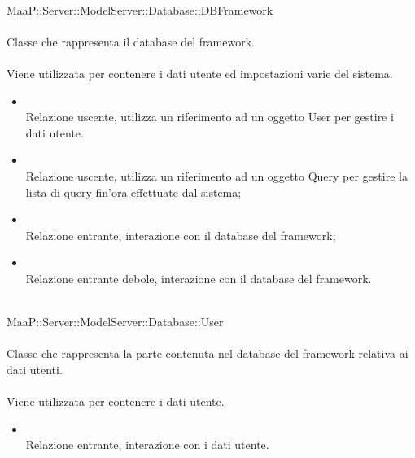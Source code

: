 		
	\\
	MaaP::Server::ModelServer::Database::DBFramework\\
	\\
	Classe che rappresenta il database del framework.\\
	\\
	Viene utilizzata per contenere i dati utente ed impostazioni varie del sistema.\\
	\begin{itemize}
	\item{}\\
	Relazione uscente, utilizza un riferimento ad un oggetto User per gestire i dati utente.
	\item{}\\
	Relazione uscente, utilizza un riferimento ad un oggetto Query per gestire la lista di query fin'ora effettuate dal sistema;
	\item{}\\
	Relazione entrante, interazione con il database del framework;
	\item{}\\
	Relazione entrante debole, interazione con il database del framework.
	\end{itemize}
	
	\\
	MaaP::Server::ModelServer::Database::User\\
	\\
	Classe che rappresenta la parte contenuta nel database del framework relativa ai dati utenti.\\
	\\
	Viene utilizzata per contenere i dati utente.\\
	\begin{itemize}
	\item{}\\
	Relazione entrante, interazione con i dati utente.
	\end{itemize}
	
